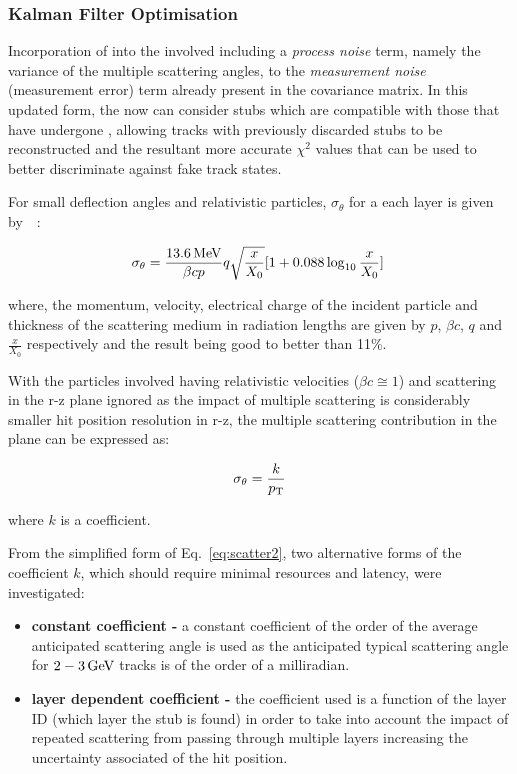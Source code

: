 \subsubsection{Kalman Filter Optimisation}\label{subsubsec:lowPtOptKF}
Incorporation of \MS into the \KF involved including a \emph{process noise} term, namely the variance of the multiple scattering angles, to the \emph{measurement noise} (\ie measurement error) term already present in the \KF covariance matrix.
In this updated form, the \KF now can consider stubs which are compatible with those that have undergone \MS, allowing tracks with previously discarded stubs to be reconstructed and the resultant more accurate $\chi^{2}$ values that can be used to better discriminate against fake track states.

For small deflection angles and relativistic particles, $\sigma_{\theta}$ for a each layer is given by~\cite{Lynch:1990sq}~:

\begin{equation}
\sigma_{\theta} = \frac{13.6\,\text{Me\hspace{-.08em}V}}{\beta c p} q \sqrt{\frac{x}{X_{0}}} [1 + 0.088 \log_{10}{\frac{x}{X_{0}}}]  \;
\label{eq:scatter1}
\end{equation}

where, the momentum, velocity, electrical charge of the incident particle and thickness of the scattering medium in radiation lengths are given by $p$, $\beta c$, $q$ and $\frac{x}{X_{0}}$ respectively and the result being good to better than 11\%.

With the particles involved having relativistic velocities (\ie $\beta c \cong 1$) and scattering in the r-z plane ignored as the impact of multiple scattering is considerably smaller hit position resolution in r-z, the multiple scattering contribution in the \rphi plane can be expressed as:

\begin{equation}
\sigma_{\theta} = \frac{k}{p_{\mathrm{T}}}
\label{eq:scatter2}
\end{equation}

where $k$ is a coefficient.

From the simplified form of Eq.~\ref{eq:scatter2}, two alternative forms of the coefficient $k$, which should require minimal resources and latency, were investigated:

\begin{itemize}
\item \textbf{constant coefficient - } a constant coefficient of the order of the average anticipated scattering angle is used as the anticipated typical scattering angle for $2-3\,\text{Ge\hspace{-.08em}V}$ tracks is of the order of a milliradian.
\item \textbf{layer dependent coefficient -} the coefficient used is a function of the layer ID (\ie which layer the stub is found) in order to take into account the impact of repeated scattering from passing through multiple layers increasing the uncertainty associated of the hit position.
\end{itemize}

